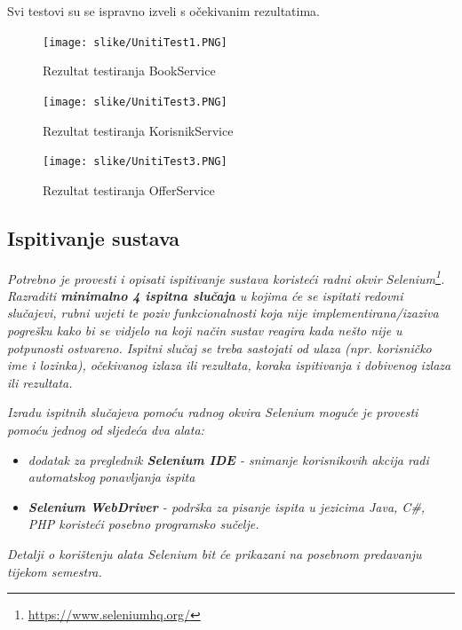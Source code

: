             Svi testovi su se ispravno izveli s očekivanim rezultatima. 
            \eject
			
			
			\begin{figure}[H]
				\texttt{[image: slike/UnitiTest1.PNG]} %
				\centering
				\caption{Rezultat testiranja BookService }
				\label{fig:BookService1}
			\end{figure}
			
			\eject
            \eject
			
			
			\begin{figure}[H]
				\texttt{[image: slike/UnitiTest3.PNG]} %
				\centering
				\caption{Rezultat testiranja KorisnikService }
				\label{fig:KorisnikService1}
			\end{figure}
			
			\eject
            \eject
			
			
			\begin{figure}[H]
				\texttt{[image: slike/UnitiTest3.PNG]} %
				\centering
				\caption{Rezultat testiranja OfferService}
				\label{fig:OfferService1}
			\end{figure}
			
			\eject
			
			
			
			
			
			\subsection{Ispitivanje sustava}
			
			 \textit{Potrebno je provesti i opisati ispitivanje sustava koristeći radni okvir Selenium\footnote{\url{https://www.seleniumhq.org/}}. Razraditi \textbf{minimalno 4 ispitna slučaja} u kojima će se ispitati redovni slučajevi, rubni uvjeti te poziv funkcionalnosti koja nije implementirana/izaziva pogrešku kako bi se vidjelo na koji način sustav reagira kada nešto nije u potpunosti ostvareno. Ispitni slučaj se treba sastojati od ulaza (npr. korisničko ime i lozinka), očekivanog izlaza ili rezultata, koraka ispitivanja i dobivenog izlaza ili rezultata.\\ }
			 
			 \textit{Izradu ispitnih slučajeva pomoću radnog okvira Selenium moguće je provesti pomoću jednog od sljedeća dva alata:}
			 \begin{itemize}
			 	\item \textit{dodatak za preglednik \textbf{Selenium IDE} - snimanje korisnikovih akcija radi automatskog ponavljanja ispita	}
			 	\item \textit{\textbf{Selenium WebDriver} - podrška za pisanje ispita u jezicima Java, C\#, PHP koristeći posebno programsko sučelje.}
			 \end{itemize}
		 	\textit{Detalji o korištenju alata Selenium bit će prikazani na posebnom predavanju tijekom semestra.}
			
